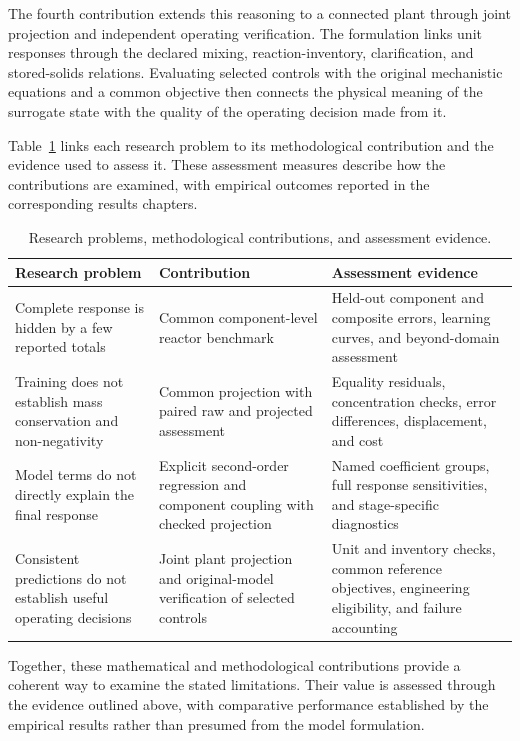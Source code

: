 The fourth contribution extends this reasoning to a connected plant through joint projection and independent operating verification. The formulation links unit responses through the declared mixing, reaction-inventory, clarification, and stored-solids relations. Evaluating selected controls with the original mechanistic equations and a common objective then connects the physical meaning of the surrogate state with the quality of the operating decision made from it.

Table~\ref{tab:introduction_contributions} links each research problem to its methodological contribution and the evidence used to assess it. These assessment measures describe how the contributions are examined, with empirical outcomes reported in the corresponding results chapters.

\begin{table}[htbp]
\centering\small
\caption{Research problems, methodological contributions, and assessment evidence.}
\label{tab:introduction_contributions}
\begin{tabular}{p{}p{}p{}}
\toprule
Research problem & Contribution & Assessment evidence\\
\midrule
Complete response is hidden by a few reported totals & Common component-level reactor benchmark & Held-out component and composite errors, learning curves, and beyond-domain assessment\\
Training does not establish mass conservation and non-negativity & Common projection with paired raw and projected assessment & Equality residuals, concentration checks, error differences, displacement, and cost\\
Model terms do not directly explain the final response & Explicit second-order regression and component coupling with checked projection & Named coefficient groups, full response sensitivities, and stage-specific diagnostics\\
Consistent predictions do not establish useful operating decisions & Joint plant projection and original-model verification of selected controls & Unit and inventory checks, common reference objectives, engineering eligibility, and failure accounting\\
\bottomrule
\end{tabular}
\end{table}

Together, these mathematical and methodological contributions provide a coherent way to examine the stated limitations. Their value is assessed through the evidence outlined above, with comparative performance established by the empirical results rather than presumed from the model formulation.


